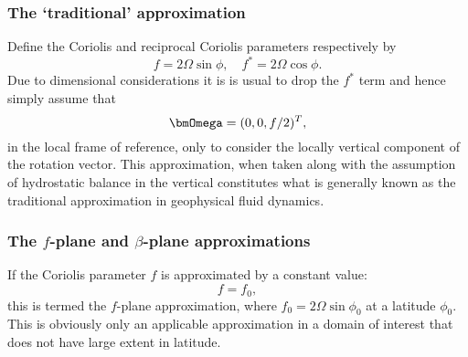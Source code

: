 \subsubsection{The `traditional' approximation}
Define the Coriolis and reciprocal Coriolis parameters \citep{cushman1994} respectively by
\begin{equation}\label{eq:coriolis_parameters} 
f=2\Omega\sin\phi,\quad f^*=2\Omega\cos\phi.
\end{equation}
Due to dimensional considerations it is is usual to
drop the $f^*$ term and hence simply assume that 
\begin{equation}\label{eq:f_omega}
\bmOmega=(0,0,f/2)^T,
\end{equation}
in the local frame of reference, \ie only to consider the locally vertical
component of the rotation vector.
This approximation, when taken along with the assumption of hydrostatic balance in the
vertical constitutes what is generally known as the traditional approximation in geophysical fluid
dynamics.


\subsubsection{The $f$-plane and $\beta$-plane approximations}
If the Coriolis parameter $f$ is approximated by a constant value:
\begin{equation}\label{eq:f-plane}
f=f_0,
\end{equation}
this is termed the $f$-plane approximation, 
where $f_0 = 2\Omega\sin\phi_0$ at a latitude $\phi_0$.
This is obviously only an applicable approximation in a domain of interest 
that does not have large extent in latitude. 

